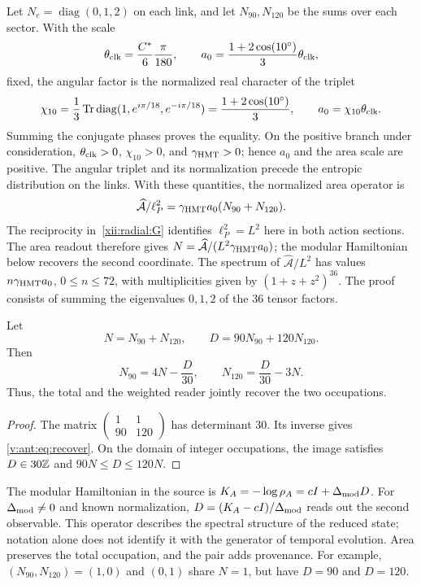 Let $N_e=\operatorname{diag}(0,1,2)$ on each link, and let
$N_{90},N_{120}$ be the sums over each sector. With the scale
\[
\theta_{\rm clk}=\frac{C^*}{6}\frac{\pi}{180},\qquad
a_0=\frac{1+2\cos(10^\circ)}3\theta_{\rm clk},
\]
fixed, the angular factor is the normalized real character of the triplet
\begin{equation}
 \chi_{10}=\frac13\operatorname{Tr}\operatorname{diag}
       (1,e^{i\pi/18},e^{-i\pi/18})
 =\frac{1+2\cos(10^\circ)}3,
 \qquad a_0=\chi_{10}\theta_{\rm clk}.
 \label{v:ant:eq:ii-area-caracter-triplete}
\end{equation}
Summing the conjugate phases proves the equality. On the positive branch
under consideration, \(\theta_{\rm clk}>0\), \(\chi_{10}>0\), and
\(\gamma_{\mathrm{HMT}}>0\); hence \(a_0\) and the area scale are
positive. The angular triplet and its normalization precede the
entropic distribution on the links. With these quantities,
the normalized area operator is
\[
\widehat{\mathcal A}/\ell_P^2
=\gamma_{\mathrm{HMT}}a_0(N_{90}+N_{120}).
\]
The reciprocity in~\eqref{xii:radial:G} identifies
\(\ell_P^2=L^2\) here in both action sections. The area readout
therefore gives \(N=\widehat{\mathcal A}/(L^2\gamma_{\mathrm{HMT}}a_0)\);
the modular Hamiltonian below recovers the second coordinate.
The spectrum of \(\widehat{\mathcal A}/L^2\) has values $n\gamma_{\mathrm{HMT}}a_0$, $0\le n\le72$,
with multiplicities given by $(1+z+z^2)^{36}$.
The proof consists of summing the eigenvalues $0,1,2$ of the
36 tensor factors.

\begin{theorem}
Let
\[
N=N_{90}+N_{120},\qquad D=90N_{90}+120N_{120}.
\]
Then
\begin{equation}
N_{90}=4N-\frac D{30},\qquad
N_{120}=\frac D{30}-3N.
\label{v:ant:eq:recover}
\end{equation}
Thus, the total and the weighted reader jointly recover
the two occupations.
\end{theorem}
\begin{proof}
The matrix $\left(\begin{smallmatrix}1&1\\90&120\end{smallmatrix}\right)$
has determinant $30$. Its inverse gives \eqref{v:ant:eq:recover}.
On the domain of integer occupations, the image satisfies
$D\in30\mathbb Z$ and $90N\le D\le120N$.
\end{proof}

The modular Hamiltonian in the source is
$K_A=-\log\rho_A=cI+\Delta_{\rm mod}D$.
For $\Delta_{\rm mod}\ne0$ and known normalization,
$D=(K_A-cI)/\Delta_{\rm mod}$ reads out the second observable.
This operator describes the spectral structure of the reduced state;
notation alone does not identify it with the generator of temporal evolution.
Area preserves the total occupation, and the pair adds provenance.
For example, $(N_{90},N_{120})=(1,0)$ and $(0,1)$ share $N=1$,
but have $D=90$ and $D=120$.

